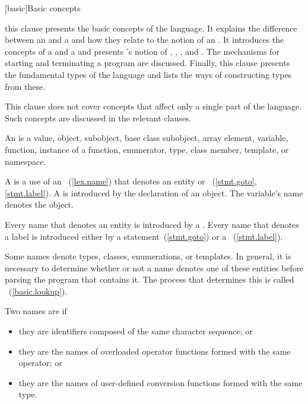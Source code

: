 [basic]{Basic concepts}


\pnum
\enternote this clause presents the basic concepts of the \Cpp language.
It explains the difference between an  and a
 and how they relate to the notion of an .
It introduces the concepts of a
 and a  and presents \Cpp's
notion of , , , and
 . The mechanisms for starting and
terminating a program are discussed. Finally, this clause presents the
fundamental types of the language and lists the ways of constructing
 types from these.

\pnum
This clause does not cover concepts that affect only a single
part of the language. Such concepts are discussed in the relevant
clauses. \exitnote

\pnum
{}%
%
%
%
%
%
%
%
%
An  is a value, object, subobject, base class subobject,
array element, variable, function, instance of a function, enumerator, type,
class member, template, or namespace.

\pnum
A  is a use of an ~(\ref{lex.name}) that
denotes an entity or ~(\ref{stmt.goto}, \ref{stmt.label}).
A  is introduced by the declaration of an object.
The variable's name denotes the object.

\pnum
Every name that denotes an entity is introduced by a
. Every name that denotes a label is introduced
either by a  statement~(\ref{stmt.goto}) or a
~(\ref{stmt.label}).

\pnum
Some names denote types, classes, enumerations, or templates. In general,
it is necessary to determine whether or not a name denotes
one of these entities before parsing the program that contains it. The
process that determines this is called
%
~(\ref{basic.lookup}).

\pnum
Two names are  if

\begin{itemize}
\item they are identifiers composed of the same character sequence; or
\item they are the names of overloaded operator functions formed with
the same operator; or
\item they are the names of user-defined conversion functions formed
with the same type.
\end{itemize}

